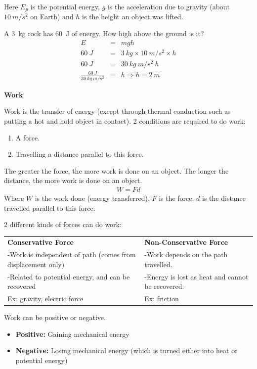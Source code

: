 \documentclass[12pt]{article}
\begin{document}
Here $E_p$ is the potential energy, $g$ is the acceleration due to gravity (about $10~m/s^2$ on Earth) and $h$ is the height an object was lifted.

\noindent A 3~kg rock has 60~J of energy. How high above the ground is it?
\begin{eqnarray}
E &=& mgh \\
60~J &=& 3~kg \times 10~m/s^2 \times h \\
60~J &=& 30~kg~m/s^2~h \\
\frac{60~J}{30~kg~m/s^2} &=& h \Rightarrow h = 2~m
\end{eqnarray}

\textbf{Work}

Work is the transfer of energy (except through thermal conduction such as putting a hot and hold object in contact). 2 conditions are required to do work:
\begin{enumerate}
	\item A force.
	\item Travelling a distance parallel to this force.
\end{enumerate}

The greater the force, the more work is done on an object. The longer the distance, the more work is done on an object.
\begin{eqnarray}
	W = F d \nonumber
\end{eqnarray}
Where $W$ is the work done (energy transferred), $F$ is the force, $d$ is the distance travelled parallel to this force.

2 different kinds of forces can do work:
\vspace{0.1in}

     \noindent\begin{tabularx}{\textwidth}{ |X | X }
      \textbf{Conservative Force} & \textbf{Non-Conservative Force}
      \\
      -Work is independent of path (comes from displacement only) & -Work depends on the path travelled. \\
      -Related to potential energy, and can be recovered & -Energy is lost as heat and cannot be recovered. \\
      Ex: gravity, electric force & Ex: friction \\
      \end{tabularx}

Work can be positive or negative.
\begin{itemize}
	\item \textbf{Positive:} Gaining mechanical energy
	\item \textbf{Negative:} Losing mechanical energy (which is turned either into heat or potential energy)
\end{itemize}
\end{document}
